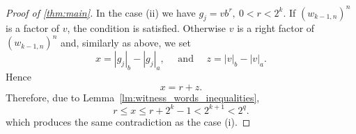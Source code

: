 \begin{proof}[Proof of \autoref*{thm:main}]
    In the case (ii) we have $g_j = v b^{r}, \: 0 < r < 2^k$. If ${(w_{k-1,n})}^{n}$ is a factor of $v$, the condition is satisfied. Otherwise $v$ is a right factor of ${(w_{k-1,n})}^{n}$ and, similarly as above, we set
    \[
        x = |g_j|_b - |g_j|_a, \quad \text{ and } \quad z = |v|_b - |v|_a.
    \]
    Hence
    \[
        x = r + z.
    \]
    Therefore, due to Lemma~\ref*{lm:witness_words_inequalities},
    \[
        r \leq x \leq r + 2^k - 1 < 2^{k+1} < 2^q.
    \]
    which produces the same contradiction as the case (i).
\end{proof}